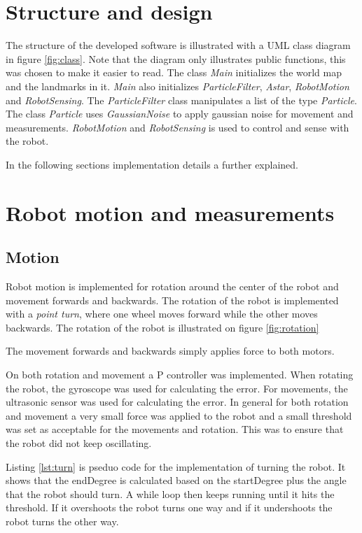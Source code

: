 \section{Structure and design}
The structure of the developed software is illustrated with a UML class diagram in figure \ref{fig:class}. Note that the diagram only illustrates public functions, this was chosen to make it easier to read. The class \emph{Main} initializes the world map and the landmarks in it. \emph{Main} also initializes \emph{ParticleFilter}, \emph{Astar}, \emph{RobotMotion} and \emph{RobotSensing}. The \emph{ParticleFilter} class manipulates a list of the type \emph{Particle}. The class \emph{Particle} uses \emph{GaussianNoise} to apply gaussian noise for movement and measurements. \emph{RobotMotion} and \emph{RobotSensing} is used to control and sense with the robot.


In the following sections implementation details a further explained.

\section{Robot motion and measurements}
\subsection{Motion}
Robot motion is implemented for rotation around the center of the robot and movement forwards and backwards. The rotation of the robot is implemented with a \emph{point turn}, where one wheel moves forward while the other moves backwards. The rotation of the robot is illustrated on figure \ref{fig:rotation}



The movement forwards and backwards simply applies force to both motors. 

On both rotation and movement a P controller was implemented. When rotating the robot, the gyroscope was used for calculating the error. For movements, the ultrasonic sensor was used for calculating the error. In general for both rotation and movement a very small force was applied to the robot and a small threshold was set as acceptable for the movements and rotation. This was to ensure that the robot did not keep oscillating.

Listing \ref{lst:turn} is pseduo code for the implementation of turning the robot. It shows that the endDegree is calculated based on the startDegree plus the angle that the robot should turn. A while loop then keeps running until it hits the threshold. If it overshoots the robot turns one way and if it undershoots the robot turns the other way.

